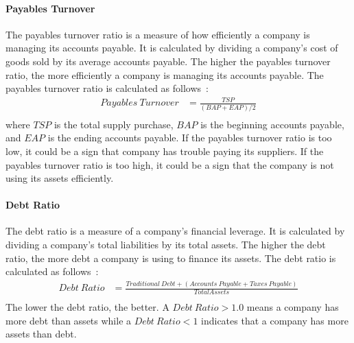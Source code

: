 \documentclass[../xlapes02]{subfiles}
\begin{document}
    \paragraph{Payables Turnover}\label{par:payables-turnover}
    The payables turnover ratio is a measure of how efficiently a company is managing its accounts payable. It is calculated by dividing a company's cost of goods sold by its average accounts payable. The higher the payables turnover ratio, the more efficiently a company is managing its accounts payable. The payables turnover ratio is calculated as follows~\cite{investopedia-payables-turnover}:
    \begin{equation}
        \begin{split}
            Payables\ Turnover&=\frac{TSP}{(BAP+EAP)/2}\\
        \end{split}
    \end{equation}
    where $TSP$ is the total supply purchase, $BAP$ is the beginning accounts payable, and $EAP$ is the ending accounts payable. If the payables turnover ratio is too low, it could be a sign that company has trouble paying its suppliers. If the payables turnover ratio is too high, it could be a sign that the company is not using its assets efficiently.

    \paragraph{Debt Ratio}\label{par:debt-ratio}
    The debt ratio is a measure of a company's financial leverage. It is calculated by dividing a company's total liabilities by its total assets. The higher the debt ratio, the more debt a company is using to finance its assets. The debt ratio is calculated as follows~\cite{investopedia-debt-ratio}:
    \begin{equation}
        \begin{split}
            Debt\ Ratio&=\frac{Traditional\ Debt+(Accounts\ Payable+Taxes\ Payable)}{Total Assets}\\
        \end{split}
    \end{equation}
    The lower the debt ratio, the better. A $Debt\ Ratio > 1.0$ means a company has more debt than assets while a $Debt\ Ratio < 1$ indicates that a company has more assets than debt.
\end{document}
